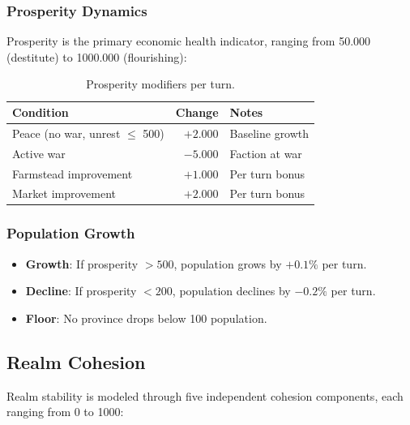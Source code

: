 \documentclass[a4paper, 11pt]{article}
\begin{document}
\subsubsection{Prosperity Dynamics}

Prosperity is the primary economic health indicator, ranging from 50.000
(destitute) to 1000.000 (flourishing):

\begin{table}[htbp]
\centering
\caption{Prosperity modifiers per turn.}
\label{tab:prosperity}
\begin{tabular}{@{}lrl@{}}
\toprule
\textbf{Condition} & \textbf{Change} & \textbf{Notes} \\
\midrule
Peace (no war, unrest $\leq$ 500) & $+2.000$ & Baseline growth \\
Active war                        & $-5.000$ & Faction at war \\
Farmstead improvement             & $+1.000$ & Per turn bonus \\
Market improvement                & $+2.000$ & Per turn bonus \\
\bottomrule
\end{tabular}
\end{table}

\subsubsection{Population Growth}

\begin{itemize}
  \item \textbf{Growth}: If prosperity $> 500$, population grows by $+0.1\%$ per turn.
  \item \textbf{Decline}: If prosperity $< 200$, population declines by $-0.2\%$ per turn.
  \item \textbf{Floor}: No province drops below 100 population.
\end{itemize}

\subsection{Realm Cohesion}
\label{sec:cohesion}

Realm stability is modeled through five independent cohesion components, each
ranging from 0 to 1000:
\end{document}
